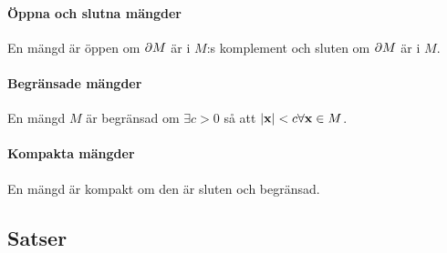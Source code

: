 \paragraph{Öppna och slutna mängder}
En mängd är öppen om $\partial M$ är i $M$:s komplement och sluten om $\partial M$ är i $M$.

\paragraph{Begränsade mängder}
En mängd $M$ är begränsad om $\exists c > 0$ så att $\abs{\vect{x}} < c\forall \vect{x}\in M$.

\paragraph{Kompakta mängder}
En mängd är kompakt om den är sluten och begränsad.

\subsection{Satser}